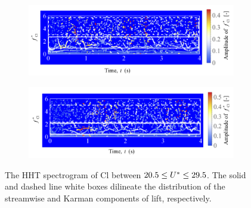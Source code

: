 \documentclass[oneside]{utmthesis}
\begin{document}
\begin{figure} \continuedfloat
  \centering
  \begin{subfigure}[h]{1\textwidth}
    \includegraphics[width=\textwidth]{figs/instantLiftFreq-d}
    \caption{}
    \label{fig:instantLiftFreq-d}
  \end{subfigure}

  \begin{subfigure}[h]{1\textwidth}
    \includegraphics[width=\textwidth]{figs/instantLiftFreq-e}
    \caption{}
    \label{fig:instantLiftFreq-e}
  \end{subfigure}
  \caption{The HHT spectrogram of Cl between $20.5 \leq U^{*} \leq 29.5$. The solid and dashed line white boxes dilineate the distribution of the streamwise and Karman components of lift, respectively.}
  \label{fig:instantLiftFreq}
\end{figure}
\end{document}
